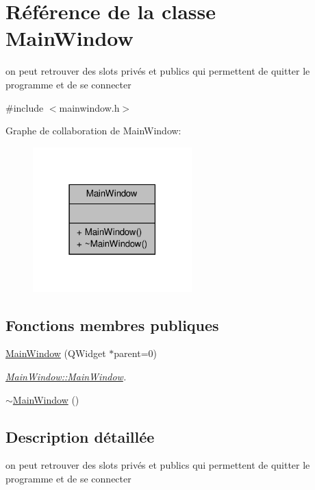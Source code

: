 \hypertarget{class_main_window}{\section{Référence de la classe Main\-Window}
\label{class_main_window}
}


on peut retrouver des slots privés et publics qui permettent de quitter le programme et de se connecter  




{\ttfamily \#include $<$mainwindow.\-h$>$}



Graphe de collaboration de Main\-Window\-:\nopagebreak
\begin{figure}[H]
\begin{center}
\leavevmode
\includegraphics[width=174pt]{class_main_window__coll__graph}
\end{center}
\end{figure}
\subsection*{Fonctions membres publiques}
\begin{DoxyCompactItemize}
\item 
\hyperlink{class_main_window_a8b244be8b7b7db1b08de2a2acb9409db}{Main\-Window} (Q\-Widget $\ast$parent=0)
\begin{DoxyCompactList}\small\item\em \hyperlink{class_main_window_a8b244be8b7b7db1b08de2a2acb9409db}{Main\-Window\-::\-Main\-Window}. \end{DoxyCompactList}\item 
\hyperlink{class_main_window_ae98d00a93bc118200eeef9f9bba1dba7}{$\sim$\-Main\-Window} ()
\end{DoxyCompactItemize}


\subsection{Description détaillée}
on peut retrouver des slots privés et publics qui permettent de quitter le programme et de se connecter 

